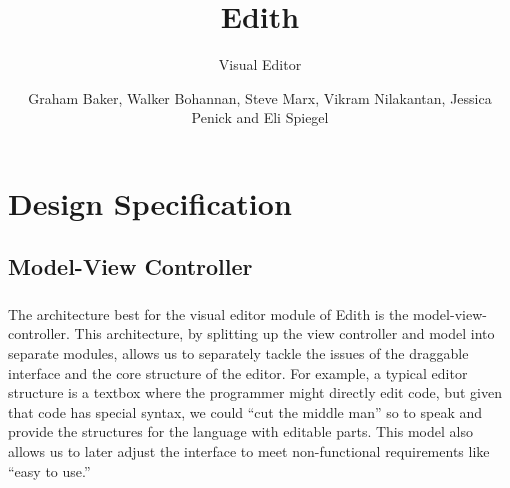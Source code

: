 \documentclass{llncs}
\begin{document}
\title{Edith}


\subtitle{Visual Editor}


\author{Graham Baker, Walker Bohannan, Steve Marx, Vikram Nilakantan, Jessica Penick and Eli Spiegel}








\maketitle


\clearpage

\section{Design Specification}

\subsection{Model-View Controller}
\subsubsection{}
The architecture best for the visual editor module of Edith is the model-view-controller. This architecture, by splitting up the view controller and model into separate modules, allows us to separately tackle the issues of the draggable interface and the core structure of the editor. For example, a typical editor structure is a textbox where the programmer might directly edit code, but given that code has special syntax, we could “cut the middle man” so to speak and provide the structures for the language with editable parts. This model also allows us to later adjust the interface to meet non-functional requirements like “easy to use.”
 
\end{document}
